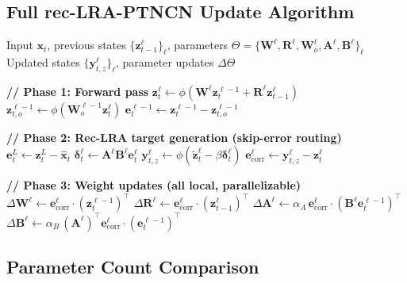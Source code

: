 \documentclass[11pt]{article}
\theoremstyle{definition}
\newcommand{\vz}{\mathbf{z}}
\newcommand{\vy}{\mathbf{y}}
\newcommand{\ve}{\mathbf{e}}
\newcommand{\vx}{\mathbf{x}}
\newcommand{\W}{\mathbf{W}}
\newcommand{\R}{\mathbf{R}}
\newcommand{\A}{\mathbf{A}}
\newcommand{\B}{\mathbf{B}}
\begin{document}
\subsection{Full rec-LRA-PTNCN Update Algorithm}

\begin{algorithm}[H]
\caption{rec-LRA-PTNCN: One Time Step}
\label{alg:reclra_ptncn}
\begin{algorithmic}[1]
  \Require Input $\vx_t$, previous states $\{\vz^\ell_{t-1}\}_\ell$,
           parameters $\Theta = \{\W^\ell, \R^\ell, \W^\ell_o, \A^\ell, \B^\ell\}_\ell$
  \Ensure Updated states $\{\vy^\ell_{t,z}\}_\ell$, parameter updates $\Delta\Theta$

  \State \textbf{// Phase 1: Forward pass}
    \State $\vz^\ell_t \gets \phi(\W^\ell \vz^{\ell-1}_t + \R^\ell \vz^\ell_{t-1})$
    \State $\vz^{\ell-1}_{t,o} \gets \phi(\W^{\ell-1}_o \vz^\ell_t)$
    \State $\ve^{\ell-1}_t \gets \vz^{\ell-1}_t - \vz^{\ell-1}_{t,o}$
  \EndFor

  \State \textbf{// Phase 2: Rec-LRA target generation (skip-error routing)}
  \State $\ve^L_t \gets \vz^L_t - \hat{\vx}_t$ 
   
    \State $\bm{\delta}^\ell_t \gets \A^\ell \B^\ell \ve^\ell_t$
    \State $\vy^\ell_{t,z} \gets \phi(\tilde{\vz}^\ell_t - \beta \bm{\delta}^\ell_t)$
    \State $\ve^\ell_\text{corr} \gets \vy^\ell_{t,z} - \vz^\ell_t$
  \EndFor

  \State \textbf{// Phase 3: Weight updates (all local, parallelizable)}
   
    \State $\Delta\W^\ell \gets \ve^\ell_\text{corr} \cdot (\vz^{\ell-1}_t)^\top$
    \State $\Delta\R^\ell \gets \ve^\ell_\text{corr} \cdot (\vz^\ell_{t-1})^\top$
    \State $\Delta\A^\ell \gets \alpha_A \, \ve^\ell_\text{corr} \cdot (\B^\ell \ve^{\ell-1}_t)^\top$
    \State $\Delta\B^\ell \gets \alpha_B \, (\A^\ell)^\top \ve^\ell_\text{corr} \cdot (\ve^{\ell-1}_t)^\top$
  \EndFor
\end{algorithmic}
\end{algorithm}

\subsection{Parameter Count Comparison}
\end{document}
